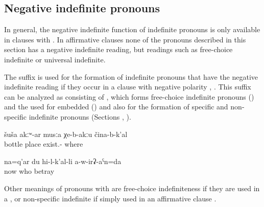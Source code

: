 
\subsection{Negative indefinite pronouns}
\label{ssec:Negative indefinite pronouns}

In general, the negative indefinite function of indefinite pronouns is only available in clauses with . In affirmative clauses none of the pronouns described in this section has a negative indefinite reading, but readings such as free-choice indefinite or universal indefinite. 

The suffix  is used for the formation of indefinite pronouns that have the negative indefinite reading if they occur in a clause with negative polarity , . This suffix can be analyzed as consisting of , which forms free-choice indefinite pronouns () and the  used for embedded  () and also for the formation of specific and non-specific indefinite pronouns (Sections , ).

\begin{exe}
	\ex	\label{ex:There is no place where there are no bottles}
	\gll	šuša	akːʷ-ar	musːa	χe-b-akːu	čina-b-k'al\\
		bottle		place	exist.-	where\\
	\glt	{}

	\ex	\label{ex:Now nobody will betray me anymore}
	\gll	na=q'ar	du	hi-l-k'al-li	a-w-irʡ-aˁn=da\\
		now		who	betray\\
	\glt	{}
\end{exe}

Other meanings of pronouns with  are free-choice indefiniteness if they are used in a  ,  or non-specific indefinite if simply used in an affirmative clause .

